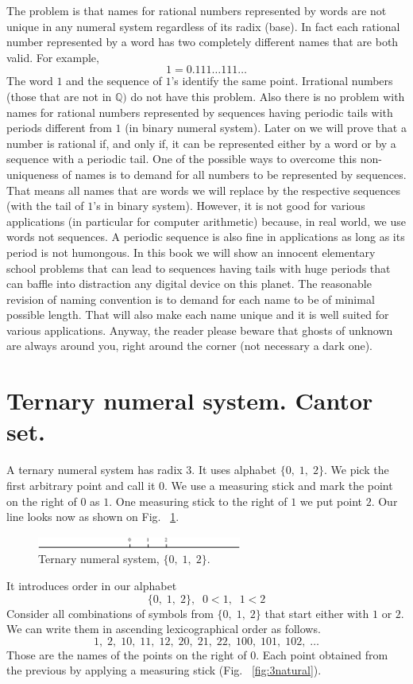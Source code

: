 \documentclass[color=black,11pt]{elegantpaper}
\begin{document}
The problem is that names for rational numbers represented by words are not unique in any numeral system regardless of its radix (base). In fact each rational number represented by a word has two completely different names that are both valid. For example,
$$
1 = 0.111 \dots 111 \dots
$$  
The word $1$ and the sequence of $1$'s identify the same point. Irrational numbers (those that are not in $\mathbb{Q})$ do not have this problem. Also there is no problem with names for  rational numbers represented by sequences having periodic tails with periods different from $1$ (in binary numeral system). Later on we will prove that a number is rational if, and only if, it can be represented either by a word or by a sequence with a periodic tail. One of the possible ways to overcome this non-uniqueness of names is to  demand for all numbers to be represented by sequences. That means all names that are words we will replace by the respective sequences (with the tail of $1$'s in binary system). However, it is not good for various applications (in particular for computer arithmetic) because, in real world, we use words not sequences. A periodic sequence is also fine in applications as long as its period is not humongous. In this book we will show an innocent elementary school problems that can lead to sequences having tails with huge periods that can baffle into distraction any digital device on this planet. The reasonable revision of naming convention is to demand for each name to be of minimal possible length. That will also make each name unique and it is well suited for various applications. Anyway, the reader please beware that ghosts of unknown are always around you, right around the corner (not necessary a dark one).

\section{Ternary numeral system. Cantor set.}
\label{sec:ternary}
A ternary numeral system has radix $3.$  It uses alphabet $\{0,\;1,\;2\}.$  We pick the first arbitrary point and call it $0.$ We use a measuring stick and mark the point on the right of $0$ as $1.$ One measuring stick to the right of $1$ we put point $2.$ Our line looks now as shown on Fig. ~\ref{fig:3points}.
\begin{figure}[htbp]
  \centering
  \includegraphics[width=0.6\textwidth]{xfig_stuff/3points.eps}
  \caption{Ternary numeral system, $\{0,\;1,\;2\}.$} 
  \label{fig:3points}
\end{figure}
It introduces order in our alphabet
$$
\{0,\;1,\;2\}, \;\;0<1,\;\;1<2
$$
Consider all combinations of symbols from $\{0,\;1,\;2\}$  that start either with $1$ or $2.$ We can write them in ascending lexicographical order as follows.
$$
1,\; 2, \; 10,\; 11, \; 12, \;20, \; 21, \; 22,\; 100,\; 101,\;102,\; \dots
$$
Those are the names of the points on the right of $0.$ Each point obtained from the previous by applying a measuring stick (Fig. ~\ref{fig:3natural}).
\end{document}
